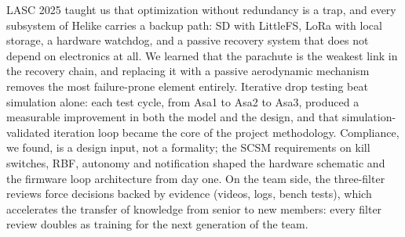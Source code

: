 LASC 2025 taught us that optimization without redundancy is a trap,
and every subsystem of Helike carries a backup path: SD with LittleFS,
LoRa with local storage, a hardware watchdog, and a passive recovery
system that does not depend on electronics at all. We learned that the
parachute is the weakest link in the recovery chain, and replacing it
with a passive aerodynamic mechanism removes the most failure-prone
element entirely. Iterative drop testing beat simulation alone: each
test cycle, from Asa1 to Asa2 to Asa3, produced a measurable
improvement in both the model and the design, and that
simulation-validated iteration loop became the core of the project
methodology. Compliance, we found, is a design input, not a formality;
the SCSM requirements on kill switches, RBF, autonomy and notification
shaped the hardware schematic and the firmware loop architecture from day one. On
the team side, the three-filter reviews force decisions backed by
evidence (videos, logs, bench tests), which accelerates the transfer
of knowledge from senior to new members: every filter review doubles
as training for the next generation of the team.
